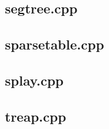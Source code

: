 \subsection{segtree.cpp}


\subsection{sparsetable.cpp}


\subsection{splay.cpp}


\subsection{treap.cpp}


